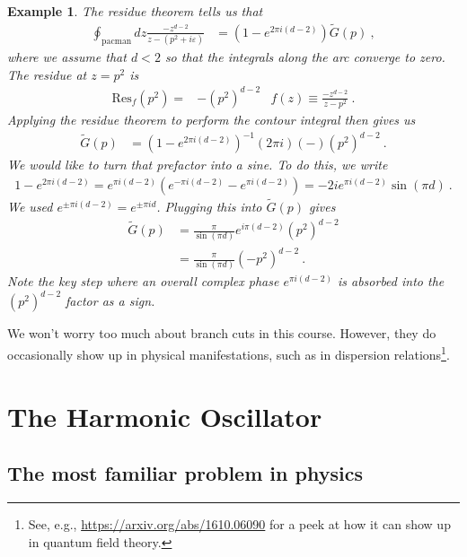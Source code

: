 \documentclass[
  11pt,
	colorful,
	raggedright,
]{tufte-style-thesis-flip}
\newtheorem{example}{Example}[section]
\begin{document}
\begin{example}
The residue theorem tells us that
\begin{align}
  \oint_\text{pacman} {dz} \frac{-z^{d-2}}{z-(p^2+i\varepsilon)}
  &=
  \left(1-e^{2\pi i(d-2)}\right) \tilde G(p) \ ,
\end{align}
where we assume that $d < 2$ so that the integrals along the arc converge to zero. The residue at $z=p^2$ is 
\begin{align}
  \text{Res}_f(p^2) =& -(p^2)^{d-2} 
  &
  f(z)\equiv 
  \frac{-z^{d-2}}{z-p^2} \ .
\end{align}
Applying the residue theorem to perform the contour integral then gives us
\begin{align}
  \tilde G(p) &= \left(1-e^{2\pi i(d-2)}\right)^{-1} (2\pi i) (-) (p^2)^{d-2}  \ .
\end{align}
We would like to turn that prefactor into a sine. To do this, we write
\begin{align}
  1-e^{2\pi i(d-2)}
  =
  e^{\pi i(d-2)}\left(e^{-\pi i(d-2)}-e^{\pi i(d-2)}\right)
  = -2i e^{\pi i(d-2)} \sin(\pi d) \ .
\end{align}
We used $e^{\pm\pi i(d-2)} = e^{\pm\pi id}$. Plugging this into $\tilde G(p)$ gives
\begin{align}
  \tilde G(p) &= 
  \frac{\pi}{\sin(\pi d)}
  e^{i\pi (d-2)}
  (p^2)^{d-2}
  \\
  & =
  \frac{\pi}{\sin(\pi d)} (-p^2)^{d-2} \ .
\end{align}
Note the key step where an overall complex phase $e^{\pi i(d-2)}$ is absorbed into the $(p^2)^{d-2}$ factor as a sign.
\end{example}

We won't worry too much about branch cuts in this course. However, they do occasionally show up in physical manifestations, such as in dispersion relations\footnote{See, e.g., \url{https://arxiv.org/abs/1610.06090} for a peek at how it can show up in quantum field theory.}.


\chapter{The Harmonic Oscillator}

\section{The most familiar problem in physics}
\end{document}
